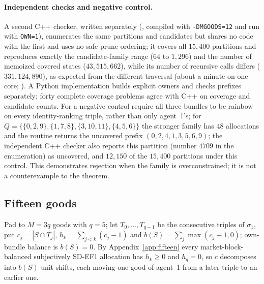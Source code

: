 \documentclass[11pt]{article}
\theoremstyle{definition}
\begin{document}
\paragraph{Independent checks and negative control.}
A second C++ checker, written separately (, compiled with \texttt{-DMGOODS=12} and run with \texttt{OWN=1}), enumerates the same partitions and candidates but shares no code with the first and uses no safe-prune ordering; it covers all $15{,}400$ partitions and reproduces exactly the candidate-family range ($64$ to $1{,}296$) and the number of memoized covered states ($43{,}515{,}662$), while its number of recursive calls differs ($331{,}124{,}890$), as expected from the different traversal (about a minute on one core; ). A Python implementation builds explicit owners and checks prefixes separately; forty complete coverage problems agree with C++ on coverage and candidate counts. For a negative control require all three bundles to be rainbow on every identity-ranking triple, rather than only agent~1's; for
$Q=\{\{0,2,9\},\{1,7,8\},\{3,10,11\},\{4,5,6\}\}$ the stronger family has $48$ allocations and the routine returns the uncovered prefix $(0,2,4,1,3,5,6,9)$; the independent C++ checker also reports this partition (number $4709$ in the enumeration) as uncovered, and $12{,}150$ of the $15{,}400$ partitions under this control. This demonstrates rejection when the family is overconstrained; it is not a counterexample to the theorem.

\subsection{Fifteen goods}
Pad to $M=3q$ goods with $q=5$; let $T_0,\dots,T_{q-1}$ be the consecutive triples of $\sigma_1$, put $c_j=|S\cap T_j|$, $h_k=\sum_{j<k}(c_j-1)$ and $b(S)=\sum_j\max(c_j-1,0)$; own-bundle balance is $b(S)=0$. By Appendix~\ref{app:fifteen} every market-block-balanced subjectively SD-EF1 allocation has $h_k\ge0$ and $h_q=0$, so $c$ decomposes into $b(S)$ unit shifts, each moving one good of agent~1 from a later triple to an earlier one.
\end{document}
